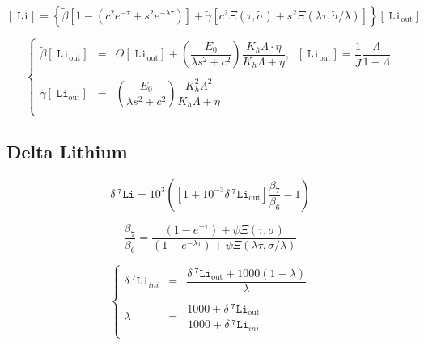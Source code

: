 \documentclass[aps,onecolumn,12pt]{revtex4}
\newcommand{\mychem}[1]{\mathtt{#1}}
\newcommand{\myconc}[1]{\left\lbrack{#1}\right\rbrack}
\newcommand{\spLi}[1]{{~^{\mychem{#1}}\mychem{Li}}}
\newcommand{\Li}[1]{\myconc{\spLi{#1}}}
\newcommand{\spLiOut}[1]{{\spLi{#1}}_{\mathrm{out}}}
\newcommand{\LiOut}[1]{\myconc{\spLiOut{#1}}}
\newcommand{\deltaLi}{ {\delta\!\!\!\spLi{7}} }
\newcommand{\deltaLiOut}{{\deltaLi}_{\mathrm{out}}}
\begin{document}
\begin{equation}
\Li{} = \left\lbrace\tilde\beta\left[ 1 - \left(c^2e^{-\tau}+s^2e^{-\lambda\tau}\right) \right] 
+ \tilde\gamma\left[ c^2\Xi\left(\tau,\tilde\sigma\right) + s^2\Xi\left(\lambda\tau,\tilde\sigma/\lambda\right)\right]\right\rbrace \LiOut{}
\end{equation}

\begin{equation}
\left\lbrace
	\begin{array}{rcl}
	\tilde\beta\LiOut{} & = & \Theta\LiOut{} + \left(\dfrac{E_0}{\lambda s^2 + c^2}\right) \dfrac{ K_h \Lambda \cdot \eta}{ K_h \Lambda + \eta },\;\; \LiOut{} = \dfrac{1}{\bar{J}}\dfrac{\Lambda}{1-\Lambda}\\
	\\
	\tilde\gamma\LiOut{} & = & \left(\dfrac{E_0}{\lambda s^2 + c^2}\right) \dfrac{K_h^2 \Lambda^2}{K_h \Lambda + \eta}\\
	\end{array}
\right.
\end{equation}

\subsection{Delta Lithium}
\begin{equation}
	\deltaLi = 10^3 \left( \left[1+10^{-3}\deltaLiOut\right] \dfrac{\beta_7}{\beta_6} - 1\right)
\end{equation}

\begin{equation}
	\dfrac{\beta_7}{\beta_6} = 
	\dfrac
	{\left(1-e^{-\tau}\right) + \psi \Xi\left(\tau,\sigma\right)}
	{\left(1-e^{-\lambda\tau}\right) + \psi \Xi\left(\lambda\tau,\sigma/\lambda\right)}
\end{equation}

\begin{equation}
\left\lbrace
	\begin{array}{rcl}
	\deltaLi_{ini} & = & \dfrac{\deltaLiOut+1000(1-\lambda)}{\lambda}\\
	\\
	\lambda        & = & \dfrac{1000+\deltaLiOut}{1000+\deltaLi_{ini}}\\
	\end{array}
\right.
\end{equation}
\end{document}
